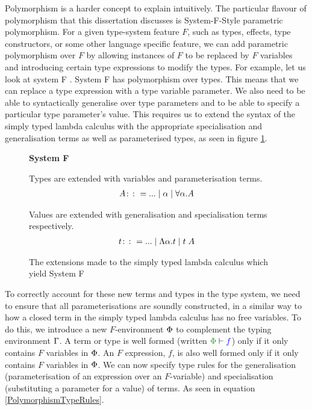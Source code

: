 \documentclass{Report}
\begin{document}
Polymorphism is a harder concept to explain intuitively. The particular flavour of polymorphism that this dissertation discusses is System-F-Style parametric polymorphism. For a given type-system feature $F$, such as types, effects, type constructors, or some other language specific feature, we can add parametric polymorphism over $F$ by allowing instances of $F$ to be replaced by $F$ variables and introducing certain type expressions to modify the types. For example, let us look at system F \cite{SystemFIntroduction}. System F has polymorphism over types. This means that we can replace a type expression with a type variable parameter. We also need to be able to syntactically generalise over type parameters and to be able to specify a particular type parameter's value. This requires us to extend the syntax of the simply typed lambda calculus with the appropriate specialisation and generalisation terms as well as parameterised types, as seen in figure \ref{SystemFTermsTypes}.

\begin{figure}
    \begin{framed}
        \centering
        \textbf{System F}

        Types are extended with variables and parameterisation terms.
        \begin{align*}
            A \gens ... \mid \a\mid \all{\a}{A}
        \end{align*}

        Values are extended with generalisation and specialisation terms respectively.
        \begin{align*}
            t \gens ... \mid \elam{\a}{t}\mid \eapp{t}{A}
        \end{align*}
    \end{framed}
    \caption{The extensions made to the simply typed lambda calculus which yield System F}
    \label{SystemFTermsTypes}
\end{figure}

To correctly account for these new terms and types in the type system, we need to ensure that all parameterisations are soundly constructed, in a similar way to how a closed term in the simply typed lambda calculus has no free variables. To do this, we introduce a new $F$-environment $\P$ to complement the typing environment $\G$. A term or type is well formed (written $\wellformed{\P}{f}$) only if it only contains $F$ variables in $\P$. An $F$ expression, $f$, is also well formed only if it only contains $F$ variables in $\P$. We can now specify type rules for the generalisation (parameterisation of an expression over an $F$-variable) and specialisation (substituting a parameter for a value) of terms. As seen in equation \ref{PolymorphismTypeRules}.
\end{document}
